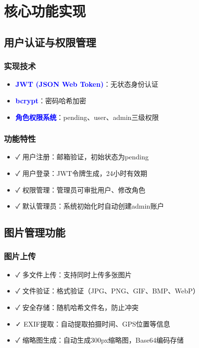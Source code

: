 \documentclass[12pt,a4paper]{article}
\newcommand{\tech}[1]{\textbf{\textcolor{blue}{#1}}}
\newcommand{\feature}[1]{\textcolor{green!60!black}{✓ #1}}
\begin{document}
\section{核心功能实现}

\subsection{用户认证与权限管理}

\subsubsection{实现技术}
\begin{itemize}
    \item \tech{JWT (JSON Web Token)}：无状态身份认证
    \item \tech{bcrypt}：密码哈希加密
    \item \tech{角色权限系统}：pending、user、admin三级权限
\end{itemize}

\subsubsection{功能特性}
\begin{itemize}
    \item \feature{用户注册}：邮箱验证，初始状态为pending
    \item \feature{用户登录}：JWT令牌生成，24小时有效期
    \item \feature{权限管理}：管理员可审批用户、修改角色
    \item \feature{默认管理员}：系统初始化时自动创建admin账户
\end{itemize}

\subsection{图片管理功能}

\subsubsection{图片上传}
\begin{itemize}
    \item \feature{多文件上传}：支持同时上传多张图片
    \item \feature{文件验证}：格式验证（JPG、PNG、GIF、BMP、WebP）
    \item \feature{安全存储}：随机哈希文件名，防止冲突
    \item \feature{EXIF提取}：自动提取拍摄时间、GPS位置等信息
    \item \feature{缩略图生成}：自动生成300px缩略图，Base64编码存储
\end{itemize}
\end{document}

